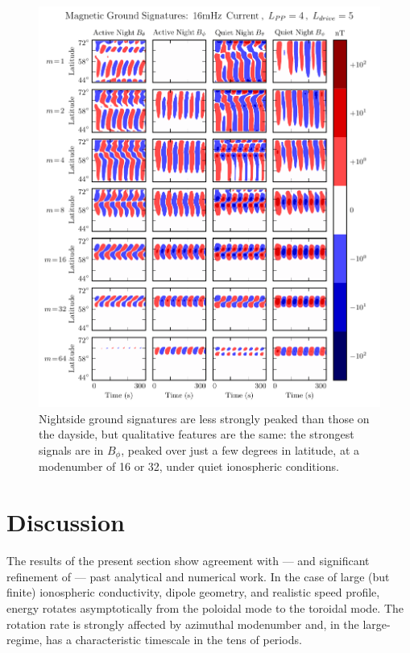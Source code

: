 \begin{figure}[!htb]
    \centering
    \includegraphics[width=\textwidth]{figures/ground_16mHz_night_4_5.pdf}
    \caption[Nightside Ground Magnetic Fields]{
      Nightside ground signatures are less strongly peaked than those on the dayside, but qualitative features are the same: the strongest signals are in $B_\phi$, peaked over just a few degrees in latitude, at a modenumber of 16 or 32, under quiet ionospheric conditions. 
    }
    \label{fig_ground_night}
\end{figure}

\section{Discussion}

The results of the present section show agreement with --- and significant refinement of --- past analytical and numerical work. In the case of large (but finite) ionospheric conductivity, dipole geometry, and realistic \Alfven speed profile, energy rotates asymptotically from the poloidal mode to the toroidal mode. The rotation rate is strongly affected by azimuthal modenumber and, in the large-\azm regime, has a characteristic timescale in the tens of periods. 

